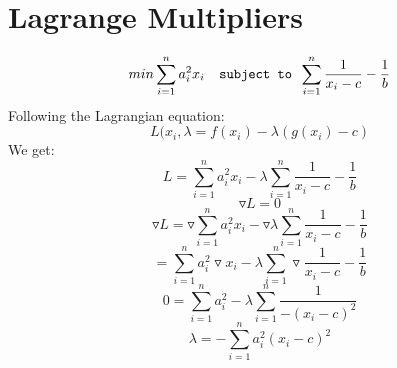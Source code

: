 \documentclass[7pt]{article}
\begin{document}
			\noindent%
	\begin{minipage}{\linewidth}%
	\end{minipage}
	\section{Lagrange Multipliers} 
	$$ min \sum_{i=1}^n a_i^2x_i \verb|  subject to | \sum_{i=1}^n \frac{1}{x_i-c} -\frac{1}{b}$$
	Following the Lagrangian equation: 
	$$ L(x_i,\lambda = f(x_i) -\lambda(g(x_i) -c) $$
	We get:
	$$L = \sum_{i=1}^n a_i^2x_i -\lambda \sum_{i=1}^n \frac{1}{x_i-c} - \frac{1}{b} $$
	$$ \triangledown L = 0 $$
	$$\triangledown L = \triangledown \sum_{i=1}^n a_i^2x_i -\triangledown \lambda \sum_{i=1}^n \frac{1}{x_i-c} - \frac{1}{b} $$
	$$ = \sum_{i=1}^n a_i^2 \triangledown x_i -\lambda \sum_{i=1}^n \triangledown \frac{1}{x_i-c} - \frac{1}{b} $$
	$$0 = \sum_{i=1}^n a_i^2 - \lambda \sum_{i=1}^n \frac{1}{-(x_i-c)^2}$$
	$$ \lambda = -\sum_{i=1}^n a_i^2 (x_i-c)^2$$
		
\end{document}
